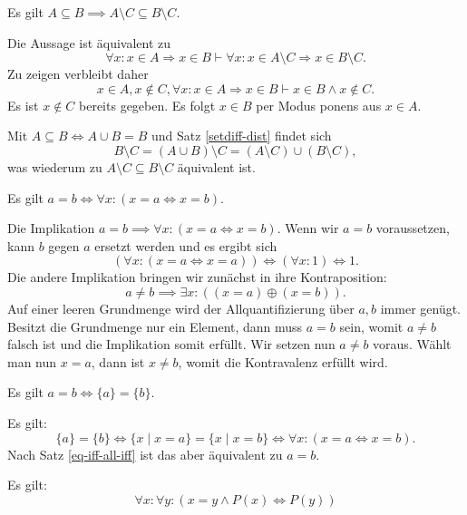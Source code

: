 \begin{Satz}\label{subseteq-diff}
Es gilt $A\subseteq B\implies A\setminus C\subseteq B\setminus C$.
\end{Satz}
\begin{Beweis}[Beweis 1]
Die Aussage ist äquivalent zu
\[\forall x\colon x\in A\Rightarrow x\in B\vdash \forall x\colon x\in A\setminus C\Rightarrow x\in B\setminus C.\]
Zu zeigen verbleibt daher
\[x\in A, x\notin C, \forall x\colon x\in A\Rightarrow x\in B\vdash x\in B\land x\notin C.\]
Es ist $x\notin C$ bereits gegeben. Es folgt $x\in B$ per Modus ponens aus $x\in A$.\,\qedsymbol
\end{Beweis}
\begin{Beweis}[Beweis 2]
Mit $A\subseteq B\Leftrightarrow A\cup B=B$ und Satz \ref{setdiff-dist} findet sich
\[B\setminus C = (A\cup B)\setminus C = (A\setminus C)\cup (B\setminus C),\]
was wiederum zu $A\setminus C\subseteq B\setminus C$ äquivalent ist.\,\qedsymbol
\end{Beweis}

\begin{Satz}\label{eq-iff-all-iff}
Es gilt $a=b\iff \forall x\colon (x=a\iff x=b)$.
\end{Satz}

\begin{Beweis}
Die Implikation $a=b\implies\forall x\colon (x=a\iff x=b)$.
Wenn wir $a=b$ voraussetzen, kann $b$ gegen $a$ ersetzt werden
und es ergibt sich
\[(\forall x\colon (x=a\iff x=a))\iff (\forall x\colon 1)\iff 1.\]
Die andere Implikation bringen wir zunächst in ihre Kontraposition:
\[a\ne b\implies \exists x\colon ((x=a)\oplus (x=b)).\]
Auf einer leeren Grundmenge wird der Allquantifizierung
über $a,b$ immer genügt. Besitzt die Grundmenge nur ein Element,
dann muss $a=b$ sein, womit $a\ne b$ falsch ist und die Implikation
somit erfüllt. Wir setzen nun $a\ne b$ voraus. Wählt man nun
$x=a$, dann ist $x\ne b$, womit die Kontravalenz erfüllt wird.\;\qedsymbol
\end{Beweis}

\begin{Satz}
Es gilt $a=b\iff\{a\}=\{b\}$.
\end{Satz}

\begin{Beweis}
Es gilt:
\[\{a\}=\{b\}\iff \{x\mid x=a\}=\{x\mid x=b\}\iff \forall x\colon (x=a\iff x=b).\]
Nach Satz \ref{eq-iff-all-iff} ist das aber äquivalent zu $a=b$.\;\qedsymbol
\end{Beweis}

\begin{Satz}\label{eq-substitution}
Es gilt:
\[\forall x\colon\forall y\colon (x=y\land P(x)\iff P(y))\]
\end{Satz}

